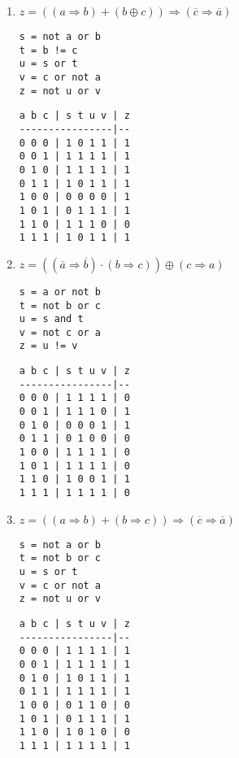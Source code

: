 \documentclass[11pt,a4paper]{article}
\begin{document}
\begin{enumerate}
\item $z = ((a \Rightarrow b) + (b \oplus c)) \Rightarrow (\overline{c} \Rightarrow \overline{a})$
\hfill
\begin{minipage}[t]{4cm}\footnotesize
\begin{Verbatim}
s = not a or b
t = b != c
u = s or t
v = c or not a
z = not u or v
\end{Verbatim}
\end{minipage}
\hspace*{3mm}
\begin{minipage}[t]{3.5cm}\footnotesize
\begin{Verbatim}
a b c | s t u v | z
----------------|--
0 0 0 | 1 0 1 1 | 1
0 0 1 | 1 1 1 1 | 1
0 1 0 | 1 1 1 1 | 1
0 1 1 | 1 0 1 1 | 1
1 0 0 | 0 0 0 0 | 1
1 0 1 | 0 1 1 1 | 1
1 1 0 | 1 1 1 0 | 0
1 1 1 | 1 0 1 1 | 1
\end{Verbatim}
\end{minipage}
\vspace*{3mm}

\item $z = ((\overline{a} \Rightarrow \overline{b}) \cdot (b \Rightarrow c)) \oplus ({c} \Rightarrow {a})$
\hfill
\begin{minipage}[t]{4cm}\footnotesize
\begin{Verbatim}
s = a or not b
t = not b or c
u = s and t
v = not c or a
z = u != v
\end{Verbatim}
\end{minipage}
\hspace*{3mm}
\begin{minipage}[t]{3.5cm}\footnotesize
\begin{Verbatim}
a b c | s t u v | z
----------------|--
0 0 0 | 1 1 1 1 | 0
0 0 1 | 1 1 1 0 | 1
0 1 0 | 0 0 0 1 | 1
0 1 1 | 0 1 0 0 | 0
1 0 0 | 1 1 1 1 | 0
1 0 1 | 1 1 1 1 | 0
1 1 0 | 1 0 0 1 | 1
1 1 1 | 1 1 1 1 | 0
\end{Verbatim}
\end{minipage}
\vspace*{3mm}

\item $z = ((a \Rightarrow b) + (b \Rightarrow c)) \Rightarrow (\overline{c} \Rightarrow \overline{a})$
\hfill
\begin{minipage}[t]{4cm}\footnotesize
\begin{Verbatim}
s = not a or b
t = not b or c
u = s or t
v = c or not a
z = not u or v
\end{Verbatim}
\end{minipage}
\hspace*{3mm}
\begin{minipage}[t]{3.5cm}\footnotesize
\begin{Verbatim}
a b c | s t u v | z
----------------|--
0 0 0 | 1 1 1 1 | 1
0 0 1 | 1 1 1 1 | 1
0 1 0 | 1 0 1 1 | 1
0 1 1 | 1 1 1 1 | 1
1 0 0 | 0 1 1 0 | 0
1 0 1 | 0 1 1 1 | 1
1 1 0 | 1 0 1 0 | 0
1 1 1 | 1 1 1 1 | 1
\end{Verbatim}
\end{minipage}
\vspace*{3mm}


\end{enumerate}
\end{document}
